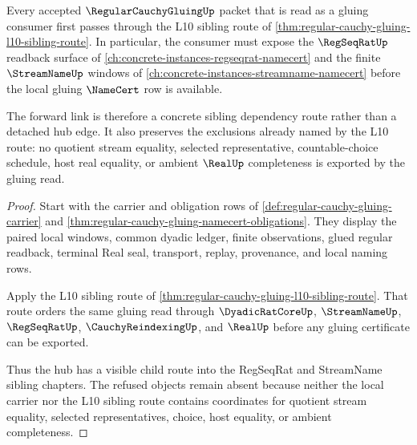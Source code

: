 \begin{theorem}
\label{thm:regular-cauchy-gluing-sibling-forward-link}
Every accepted $\RegularCauchyGluingUp$ packet that is read as a gluing consumer first passes through the L10 sibling route of \autoref{thm:regular-cauchy-gluing-l10-sibling-route}. In particular, the consumer must expose the $\RegSeqRatUp$ readback surface of \autoref{ch:concrete-instances-regseqrat-namecert} and the finite $\StreamNameUp$ windows of \autoref{ch:concrete-instances-streamname-namecert} before the local gluing $\NameCert$ row is available.

The forward link is therefore a concrete sibling dependency route rather than a detached hub edge. It also preserves the exclusions already named by the L10 route: no quotient stream equality, selected representative, countable-choice schedule, host real equality, or ambient $\RealUp$ completeness is exported by the gluing read.
\end{theorem}
\begin{proof}
Start with the carrier and obligation rows of \autoref{def:regular-cauchy-gluing-carrier} and \autoref{thm:regular-cauchy-gluing-namecert-obligations}. They display the paired local windows, common dyadic ledger, finite observations, glued regular readback, terminal Real seal, transport, replay, provenance, and local naming rows.

Apply the L10 sibling route of \autoref{thm:regular-cauchy-gluing-l10-sibling-route}. That route orders the same gluing read through $\DyadicRatCoreUp$, $\StreamNameUp$, $\RegSeqRatUp$, $\CauchyReindexingUp$, and $\RealUp$ before any gluing certificate can be exported.

Thus the hub has a visible child route into the RegSeqRat and StreamName sibling chapters. The refused objects remain absent because neither the local carrier nor the L10 sibling route contains coordinates for quotient stream equality, selected representatives, choice, host equality, or ambient completeness.
\end{proof}
